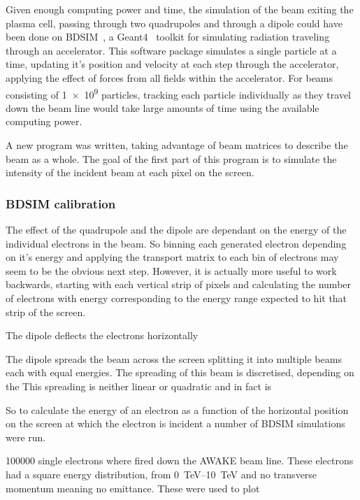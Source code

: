 Given enough computing power and time, the simulation of the beam exiting the
plasma cell, passing through two quadrupoles and through a dipole could have
been done on BDSIM~\cite{agapov2009bdsim}, a Geant4~\cite{agostinelli2003geant4}
toolkit for simulating radiation traveling through an accelerator. This software
package simulates a single particle at a time, updating it's position and
velocity at each step through the accelerator, applying the effect of forces
from all fields within the accelerator.  For beams consisting of \num{1e9}
particles, tracking each particle individually as they travel down the beam line
would take large amounts of time using the available computing power.

A new program was written, taking advantage of beam matrices to describe the
beam as a whole. The goal of the first part of this program is to simulate the
intensity of the incident beam at each pixel on the screen.

\subsubsection{BDSIM calibration}


The effect of the quadrupole and the dipole are dependant on the energy of the
individual electrons in the beam. So binning each generated electron depending
on it's energy and applying the transport matrix to each bin of electrons may
seem to be the obvious next step. However, it is actually more useful to
work backwards, starting with each vertical strip of pixels and calculating the
number of electrons with energy corresponding to the energy range expected to hit
that strip of the screen.

The dipole deflects the electrons horizontally 

The dipole spreads the beam across the screen splitting it into multiple beams
each with equal energies. The spreading of this beam is discretised, depending on
the This spreading is neither linear or quadratic and in
fact is 

So to calculate the energy of an electron as a function of the horizontal
position on the screen at which the electron is incident a number of BDSIM
simulations were run.

\num{100 000} single electrons where fired down the
AWAKE beam line.  These electrons had a square energy distribution, from
\SIrange{0}{10}{\tera\electronvolt} and no transverse momentum meaning no
emittance. These were used to plot 

